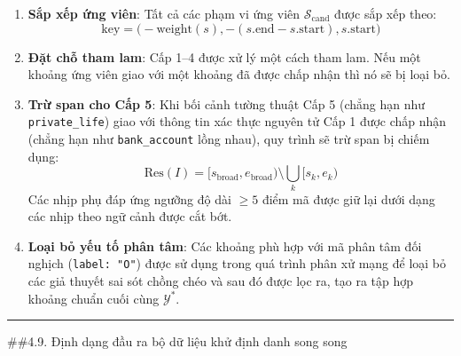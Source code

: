 \documentclass[
  11pt,
  a4paper,
]{article}
\providecommand{\tightlist}{%
  \setlength{\itemsep}{0pt}\setlength{\parskip}{0pt}}
\begin{document}
\begin{enumerate}
\def\labelenumi{\arabic{enumi}.}
\tightlist
\item
  \textbf{Sắp xếp ứng viên}: Tất cả các phạm vi ứng viên
  \(\mathcal{S}_{\text{cand}}\) được sắp xếp theo:
  \[\text{key} = \bigl(-\text{weight}(s), -(s.\text{end} - s.\text{start}), s.\text{start}\bigr)\]
\item
  \textbf{Đặt chỗ tham lam}: Cấp 1--4 được xử lý một cách tham lam. Nếu
  một khoảng ứng viên giao với một khoảng đã được chấp nhận thì nó sẽ bị
  loại bỏ.
\item
  \textbf{Trừ span cho Cấp 5}: Khi bối cảnh tường thuật Cấp 5 (chẳng hạn
  như \texttt{private\_life}) giao với thông tin xác thực nguyên tử Cấp
  1 được chấp nhận (chẳng hạn như \texttt{bank\_account} lồng nhau), quy
  trình sẽ trừ span bị chiếm dụng:
  \[\text{Res}(I) = [s_{\text{broad}}, e_{\text{broad}}) \setminus \bigcup_{k} [s_k, e_k)\]
  Các nhịp phụ đáp ứng ngưỡng độ dài \(\ge 5\) điểm mã được giữ lại dưới
  dạng các nhịp theo ngữ cảnh được cắt bớt.
\item
  \textbf{Loại bỏ yếu tố phân tâm}: Các khoảng phù hợp với mã phân tâm
  đối nghịch (\texttt{label:\ "O"}) được sử dụng trong quá trình phân xử
  mạng để loại bỏ các giả thuyết sai sót chồng chéo và sau đó được lọc
  ra, tạo ra tập hợp khoảng chuẩn cuối cùng \(\mathcal{Y}^*\).
\end{enumerate}

\begin{center}\rule{0.5\linewidth}{0.5pt}\end{center}

\#\#4.9. Định dạng đầu ra bộ dữ liệu khử định danh song song
\end{document}
